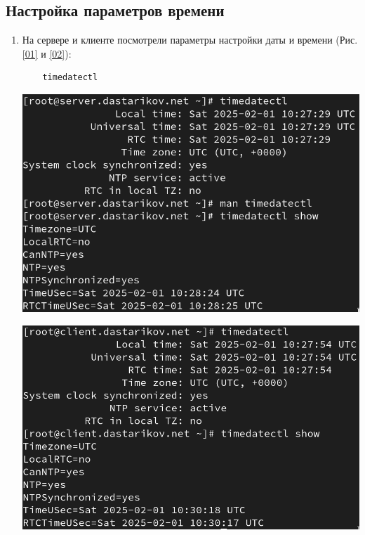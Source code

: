 \subsection{Настройка параметров времени}
\begin{enumerate}
\item На сервере и клиенте посмотрели параметры настройки даты и времени (Рис. \ref{01} и \ref{02}):
  \begin{verbatim}
    timedatectl
  \end{verbatim}
\begin{center}
    \centering
    \includegraphics[width=\textwidth]{../images/image01.png}
    \label{01}
\end{center}
\begin{center}
    \centering
    \includegraphics[width=\textwidth]{../images/image02.png}
    \label{02}
\end{center}


\end{enumerate}
